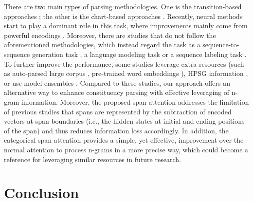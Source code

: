 \documentclass[11pt,a4paper]{article}
\begin{document}
There are two main types of parsing methodologies.
One is the transition-based approaches \cite{sagae-lavie-2005-classifier};
the other is the chart-based approaches \cite{collins-1997-three,glaysher-moldovan-2006-speeding}.
Recently, neural methods start to play a dominant role in this task, where 
improvements mainly come from powerful encodings \cite{dyer-etal-2016-recurrent,cross-huang-2016-span,liu-zhang-2017-order,stern-etal-2017-minimal,gaddy-etal-2018-whats,kitaev-klein-2018-constituency,kitaev-etal-2019-multilingual,fried-etal-2019-cross}.
Moreover, there are studies that do not follow the aforementioned methodologies, which instead 
regard the task as a sequence-to-sequence generation task \cite{NIPS2015_5635,suzuki-etal-2018-empirical}, a language modeling \cite{choe-charniak-2016-parsing} task or a sequence labeling task \cite{gomez-rodriguez-vilares-2018-constituent}.
To further improve the performance, some studies leverage extra resources (such as auto-parsed large corpus \cite{NIPS2015_5635}, pre-trained word embeddings \cite{kitaev-klein-2018-constituency}), HPSG information \cite{zhou-zhao-2019-head, mrini2019rethinking},
or use model ensembles \cite{kitaev-etal-2019-multilingual}.
Compared to these studies, our approach offers an alternative way to enhance constituency parsing with effective leveraging of n-gram information.
Moreover, the proposed span attention addresses the limitation of previous studies \cite{kitaev-klein-2018-constituency,kitaev-etal-2019-multilingual} that spans are represented by the subtraction of encoded vectors at span boundaries (i.e., the hidden states at initial and ending positions of the span) and thus reduces information loss accordingly.
In addition, the categorical span attention provides a simple, yet effective, improvement over the normal attention to process n-grams in a more precise way,
which could become a reference for leveraging similar resources in future research.




\vspace{-0.1cm}
\section{Conclusion}
\vspace{-0.1cm}
\end{document}
